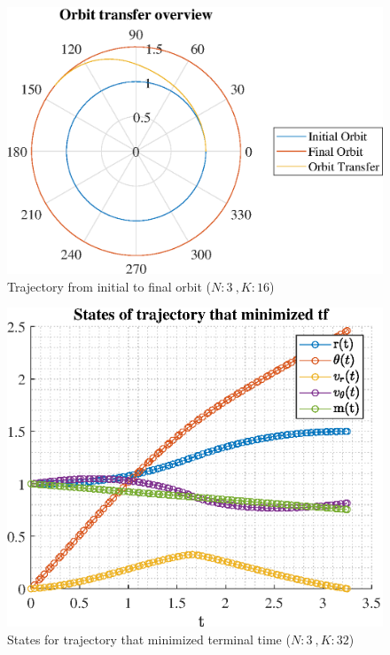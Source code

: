 \documentclass[]{article}
\begin{document}
	\begin{figure}
		\centering
		\includegraphics[scale=0.75]{orbit_N3_K16_C2_tf.eps}
		\caption{Trajectory from initial to final orbit (\(N:3\ , K:16\))}
		\label{fig:orbit_N3_K16_C2_tf}
	\end{figure}
	\begin{figure}
		\centering
		\includegraphics[scale=0.75]{states_N3_K32_C2_tf.eps}
		\caption{States for trajectory that minimized terminal time (\(N:3\ , K:32\))}
		\label{fig:states_N3_K32_C2_tf}
	\end{figure}
\end{document}
